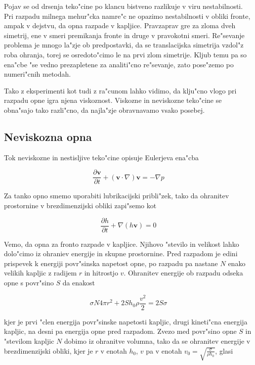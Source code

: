 \documentclass[a4paper,10pt]{article}
\renewcommand{\vec}{\mathbf}
\newcommand{\odv}[1]{\frac{\partial #1}{\partial t}}
\begin{document}
Pojav se od drsenja teko"cine po klancu bistveno razlikuje v viru nestabilnosti. Pri razpadu milnega mehur"cka namre"c ne opazimo nestabilnosti v obliki fronte, ampak v dejstvu, da opna razpade v kapljice. Pravzaprav gre za zloma dveh simetrij, ene v smeri premikanja fronte in druge v pravokotni smeri. Re"sevanje problema je mnogo la"zje ob predpostavki, da se translacijska simetrija vzdol"z roba ohranja, torej se osredoto"cimo le na prvi zlom simetrije. Kljub temu pa so ena"cbe "se vedno prezapletene za analiti"cno re"sevanje, zato pose"zemo po numeri"cnih metodah. 

Tako z eksperimenti kot tudi z ra"cunom lahko vidimo, da klju"cno vlogo pri razpadu opne igra njena viskoznost. Viskozne in neviskozne teko"cine se obna"sajo tako razli"cno, da najla"zje obravnavamo vsako posebej. 

\subsection{Neviskozna opna}
Tok neviskozne in nestisljive teko"cine opisuje Eulerjeva ena"cba

\begin{equation}
\label{eq:meh-euler}
 \odv{\vec v} + (\vec v \cdot \nabla)\vec v = - \nabla p
\end{equation}

Za tanko opno smemo uporabiti lubrikacijski pribli"zek, tako da ohranitev prostornine v brezdimenzijski obliki zapi"semo kot

\begin{equation}
\label{eq:meh-ohranitev}
 \odv{h} + \nabla (h\vec v) = 0
\end{equation}

Vemo, da opna za fronto razpade v kapljice. Njihovo "stevilo in velikost lahko dolo"cimo iz ohraniev energije in skupne prostornine. Pred razpadom je edini prispevek k energiji povr"sinska napetost opne, po razpadu pa nastane $N$ enako velikih kapljic z radijem $r$ in hitrostjo $v$. Ohranitev energije ob razpadu odseka opne s povr"sino $S$ da enakost

\begin{equation}
 \sigma N 4 \pi r^2 + 2 S h_0 \rho \frac{v^2}{2} = 2S\sigma
\end{equation}

kjer je prvi "clen energija povr"sinske napetosti kapljic, drugi kineti"cna energija kapljic, na desni pa energija opne pred razpadom. Zvezo med povr"sino opne $S$ in "stevilom kapljic $N$ dobimo iz ohranitve volumna, tako da se ohranitev energije v brezdimenzijski obliki, kjer je $r$ v enotah $h_0$, $v$ pa v enotah $v_0 = \sqrt{\frac{\sigma}{\rho h_0}}$, glasi
\end{document}
